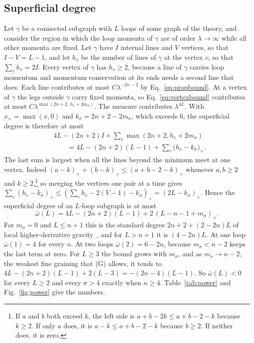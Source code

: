 \documentclass[a4paper,11pt]{article}
\begin{document}
\subsection{Superficial degree}
\label{sec:degree}

Let $\gamma$ be a connected subgraph with $L$ loops of some graph of the theory, and consider the region in which the loop momenta of $\gamma$ are of order $\lambda\to\infty$ while all other momenta are fixed. Let $\gamma$ have $I$ internal lines and $V$ vertices, so that $I-V=L-1$, and let $h_v$ be the number of lines of $\gamma$ at the vertex $v$, so that $\sum_vh_v=2I$. Every vertex of $\gamma$ has $h_v\ge2$, because a line of $\gamma$ carries loop momentum and momentum conservation at its ends needs a second line that does. Each line contributes at most $C\lambda^{-2n-2}$ by Eq.~\eqref{eq:propbound}. At a vertex of $\gamma$ the legs outside $\gamma$ carry fixed momenta, so Eq.~\eqref{eq:vertexbound} contributes at most $C\lambda^{\max(2n+2,\,h_v+2m_\sigma)}$. The measure contributes $\lambda^{4L}$. With $x_+=\max(x,0)$ and $k_\sigma=2n+2-2m_\sigma$, which exceeds $6$, the superficial degree is therefore at most
\[
\begin{aligned}
&4L-(2n+2)I+\sum_v\max(2n+2,h_v+2m_\sigma)\\
&\qquad=4L-(2n+2)(L-1)+\sum_v\bigl(h_v-k_\sigma\bigr)_+ .
\end{aligned}
\]
The last sum is largest when all the lines beyond the minimum meet at one vertex. Indeed $(a-k)_++(b-k)_+\le(a+b-2-k)_+$ whenever $a,b\ge2$ and $k\ge2$,\footnote{If $a$ and $b$ both exceed $k$, the left side is $a+b-2k\le a+b-2-k$ because $k\ge2$. If only $a$ does, it is $a-k\le a+b-2-k$ because $b\ge2$. If neither does, it is zero.} so merging the vertices one pair at a time gives $\sum_v(h_v-k_\sigma)_+\le(\sum_vh_v-2(V-1)-k_\sigma)_+=(2L-k_\sigma)_+$. Hence the superficial degree of an $L$-loop subgraph is at most
\begin{equation}
\label{eq:omega}
\bar\omega(L)=4L-(2n+2)(L-1)+2\,(L-n-1+m_\sigma)_+ .
\end{equation}
For $m_\sigma=0$ and $L\le n+1$ this is the standard degree $2n+2+(2-2n)L$ of local higher-derivative gravity~\cite{AsoreyLopezShapiro1997,Modesto2012}, and for $L>n+1$ it is $(4-2n)L$. At one loop $\bar\omega(1)=4$ for every $n$. At two loops $\bar\omega(2)=6-2n$, because $m_\sigma<n-2$ keeps the last term at zero. For $L\ge3$ the bound grows with $m_\sigma$, and as $m_\sigma\to n-2$, the weakest fine graining that (G) allows, it tends to $4L-(2n+2)(L-1)+2(L-3)=-(2n-4)(L-1)$. So $\bar\omega(L)<0$ for every $L\ge2$ and every $\sigma>4$ exactly when $n\ge4$. Table~\ref{tab:power} and Fig.~\ref{fig:power} give the numbers.
\end{document}
